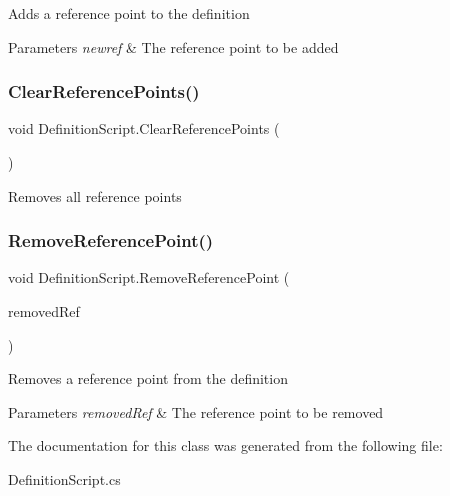 Adds a reference point to the definition 


\begin{DoxyParams}{Parameters}
{\em newref} & The reference point to be added\\
\hline
\end{DoxyParams}
\mbox{\label{class_definition_script_a8cb4f36965c85361ae6cb466596e2afd}} 
\subsubsection{\texorpdfstring{Clear\+Reference\+Points()}{ClearReferencePoints()}}
{\footnotesize\ttfamily void Definition\+Script.\+Clear\+Reference\+Points (\begin{DoxyParamCaption}{ }\end{DoxyParamCaption})}



Removes all reference points 

\mbox{\label{class_definition_script_a1e2cd233f3dff31d405c2a5dcd2bad37}} 
\subsubsection{\texorpdfstring{Remove\+Reference\+Point()}{RemoveReferencePoint()}}
{\footnotesize\ttfamily void Definition\+Script.\+Remove\+Reference\+Point (\begin{DoxyParamCaption}\item[{Game\+Object}]{removed\+Ref }\end{DoxyParamCaption})}



Removes a reference point from the definition 


\begin{DoxyParams}{Parameters}
{\em removed\+Ref} & The reference point to be removed\\
\hline
\end{DoxyParams}


The documentation for this class was generated from the following file\+:\begin{DoxyCompactItemize}
\item 
Definition\+Script.\+cs\end{DoxyCompactItemize}
